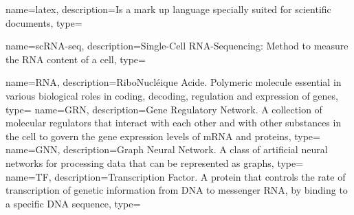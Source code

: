 {
        name=latex,
        description={Is a mark up language specially suited for 
scientific documents},
        type=\acronymtype
}

{
        name={scRNA-seq},
        description={Single-Cell RNA-Sequencing: Method to measure the RNA content of a cell},
        type=\acronymtype
}

{
    name={RNA},
    description={RiboNucléique Acide. Polymeric molecule essential in various biological roles in coding, decoding, regulation and expression of genes},
    type=\acronymtype
}
{
    name={GRN},
    description={Gene Regulatory Network. A collection of molecular regulators that interact with each other and with other substances in the cell to govern the gene expression levels of mRNA and proteins},
    type=\acronymtype
}
{
    name={GNN},
    description={Graph Neural Network. A class of artificial neural networks for processing data that can be represented as graphs},
    type=\acronymtype
}
{
    name={TF},
    description={Transcription Factor. A protein that controls the rate of transcription of genetic information from DNA to messenger RNA, by binding to a specific DNA sequence},
    type=\acronymtype
}

